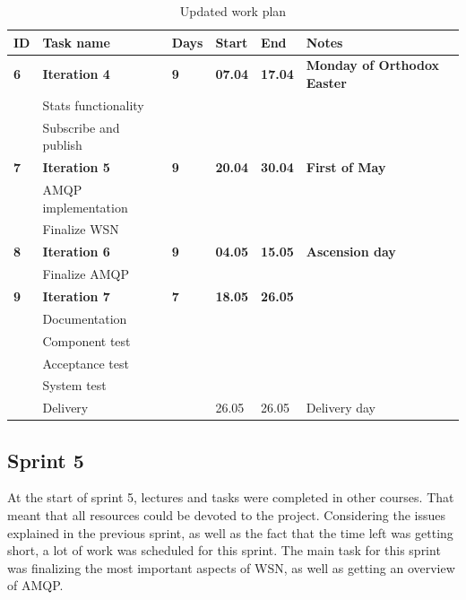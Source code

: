 \begin{center}
\begin{table}[ht!]
\centering
\small
\begin{tabular}{ | m{0.4cm} | m{3.3cm}| m{0.7cm} | m{0.9cm} | m{0.9cm}| m{4.4cm} |} 
\hline
\rowcolor{lightgray}
\textbf{ID} & \textbf{Task name} & \textbf{Days} & \textbf{Start} & \textbf{End} & \textbf{Notes} \\
\hline
\textbf{6} & \textbf{Iteration 4} & \textbf{9} & \textbf{07.04} & \textbf{17.04} & \textbf{Monday of Orthodox Easter} \\
 & Stats functionality & & & & \\
 & Subscribe and publish  & & & & \\
\hline
\textbf{7} & \textbf{Iteration 5} & \textbf{9} & \textbf{20.04} & \textbf{30.04} & \textbf{First of May} \\
 & AMQP implementation & & & & \\
 & Finalize WSN & & & & \\
\hline 
\textbf{8} & \textbf{Iteration 6} & \textbf{9} & \textbf{04.05} & \textbf{15.05} & \textbf{Ascension day} \\
 & Finalize AMQP & & & & \\
\hline
\textbf{9} & \textbf{Iteration 7} & \textbf{7} & \textbf{18.05} & \textbf{26.05} & \\
 & Documentation & & & & \\
 & Component test & & & & \\
 & Acceptance test & & & & \\
 & System test & & & & \\
 & Delivery & & 26.05 & 26.05 & Delivery day \\
\hline
\end{tabular}
\caption{Updated work plan}
\label{tab:workplan, revised}
\end{table}
\end{center}

\subsection{Sprint 5}
\label{subsec:project_lifecycle-development-sprint_5}
At the start of sprint 5, lectures and tasks were completed in other courses. That meant that all resources could be devoted to the project. Considering the issues explained in the previous sprint, as well as the fact that the time left was getting short, a lot of work was scheduled for this sprint. The main task for this sprint was finalizing the most important aspects of WSN, as well as getting an overview of AMQP.

